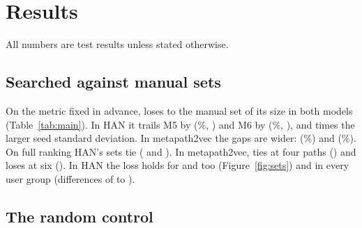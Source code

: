 \section{Results}
\label{sec:results}

All numbers are test results unless stated otherwise.

\subsection{Searched against manual sets}
\label{sec:res-main}

On the metric fixed in advance,  loses to the manual set of its size in both models
(Table~\ref{tab:main}). In HAN it trails M5 by  (\%,
) and M6 by  (\%,
),  and  times the larger seed standard
deviation. In metapath2vec the gaps are wider:  (\%)
and  (\%). On full ranking HAN's sets tie
( and ). In metapath2vec,  ties at four paths
() and loses at six (). In HAN the loss holds for 
and  too (Figure~\ref{fig:sets}) and in every user group (differences of
 to ).



\subsection{The random control}
\label{sec:res-random}

